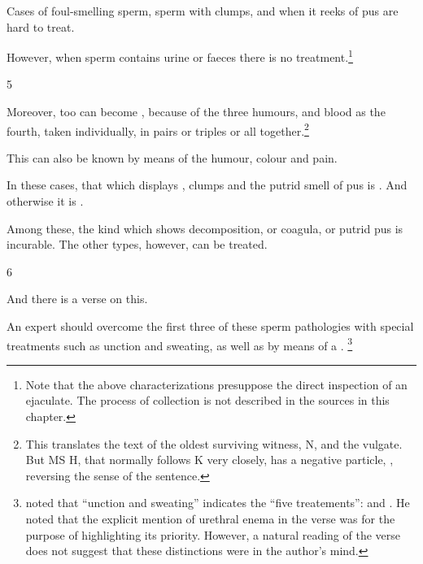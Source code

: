 \begin{translation}
Cases of foul-smelling sperm, sperm with clumps, and when it reeks of
pus are hard to treat.
  
  
   However, when sperm contains urine or faeces there is no
treatment.\footnote{Note that the above
    characterizations presuppose the direct inspection of an ejaculate. 
    The process of collection is not described in the sources in this
    chapter.}
 
 \item[5]
 
 Moreover,  too can become
,  because of the three
humours, and blood as the fourth, taken individually, in pairs or
triples or all together.\footnote{This translates the text of the oldest
    surviving witness, N, and the vulgate.  But MS H, that normally follows
    K very closely, has a negative particle, , reversing the sense
    of the sentence.}
 
 This can also be known by means of the humour, colour and pain.
 
 In these cases, that which displays , clumps 
 and the putrid smell of pus is . And otherwise it is 
 .
 
 
  Among these, the kind which shows decomposition, or coagula, or 
  putrid pus is incurable. The other types, however, can be treated.  
 
 \item[6]
 
 And there is a verse on this. 
 
 \begin{sloka}
      An expert should overcome the first three of these sperm
pathologies with special
treatments such as unction and sweating,
as well as by means of a .\label{uttarabastyantam}%
\footnote{ noted that “unction and sweating”
    indicates the “five treatements”:  and .  He noted that the explicit mention
    of urethral enema in the verse was for the purpose of highlighting its
    priority. However, a natural reading of the verse does not suggest
    that these distinctions were in the author's mind.}
    

\end{sloka}
\end{translation}
